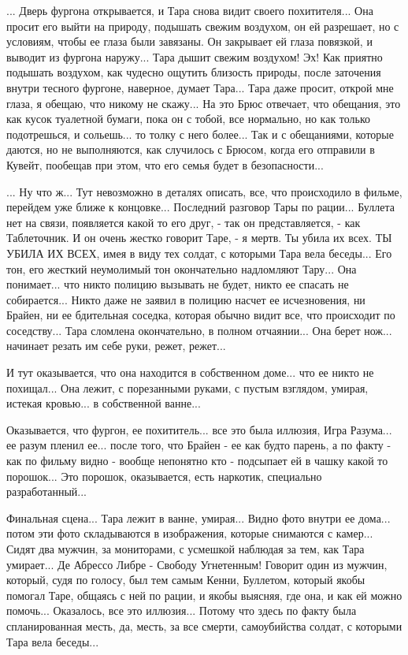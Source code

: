 ... Дверь фургона открывается, и Тара снова видит своего похитителя... Она просит его
выйти на природу, подышать свежим воздухом, он ей разрешает, но с условиям, чтобы ее глаза
были завязаны. Он закрывает ей глаза повязкой, и выводит из фургона наружу... Тара
дышит свежим воздухом! Эх! Как приятно подышать воздухом, как чудесно ощутить близость природы,
после заточения внутри тесного фургоне, наверное, думает Тара... Тара даже просит, открой мне глаза,
я обещаю, что никому не скажу... На это Брюс отвечает, что обещания, это как кусок туалетной бумаги,
пока он с тобой, все нормально, но как только подотрешься, и сольешь... то толку с него более...
Так и с обещаниями, которые даются, но не выполняются, как случилось с Брюсом, когда его отправили в Кувейт,
пообещав при этом, что его семья будет в безопасности... 

... Ну что ж... Тут невозможно в деталях описать, все, что происходило в
фильме, перейдем уже ближе к концовке...  Последний разговор Тары по рации...
Буллета нет на связи, появляется какой то его друг, - так он представляется, -
как Таблеточник. И он очень жестко говорит Таре, - я мертв. Ты убила их всех.
ТЫ УБИЛА ИХ ВСЕХ, имея в виду тех солдат, с которыми Тара вела беседы... Его
тон, его жесткий неумолимый тон окончательно надломляют Тару...  Она
понимает... что никто полицию вызывать не будет, никто ее спасать не
собирается... Никто даже не заявил в полицию насчет ее исчезновения, ни Брайен,
ни ее бдительная соседка, которая обычно видит все, что происходит по
соседству...  Тара сломлена окончательно, в полном отчаянии...  Она берет
нож... начинает резать им себе руки, режет, режет...

И тут оказывается, что она находится в собственном доме... что ее никто не
похищал...  Она лежит, с порезанными руками, с пустым взглядом, умирая, истекая
кровью... в собственной ванне... 

Оказывается, что фургон, ее похититель... все это была иллюзия, Игра Разума...
ее разум пленил ее...  после того, что Брайен - ее как будто парень, а по факту
- как по фильму видно - вообще непонятно кто - подсыпает ей в чашку какой то
порошок... Это порошок, оказывается, есть наркотик, специально разработанный...

Финальная сцена... Тара лежит в ванне, умирая... Видно фото внутри ее дома...
потом эти фото складываются в изображения, которые снимаются с камер... Сидят
два мужчин, за мониторами, с усмешкой наблюдая за тем, как Тара умирает... Де
Абрессо Либре - Свободу Угнетенным! Говорит один из мужчин, который, судя по
голосу, был тем самым Кенни, Буллетом, который якобы помогал Таре, общаясь с
ней по рации, и якобы выясняя, где она, и как ей можно помочь... Оказалось, все
это иллюзия... Потому что здесь по факту была спланированная месть, да, месть,
за все смерти, самоубийства солдат, с которыми Тара вела беседы...




